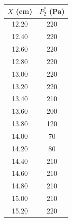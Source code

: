   \centering
  \caption[45 Hz 尾迹扫描数据]{45 Hz}
  \label{tab:exp6_45_Hz}
  \renewcommand{\arraystretch}{1.2}
  \begin{tabular}{cc}
    \toprule
    $X$ (cm) & $P_2^*$ (Pa) \\
    \midrule
    12.20 & 220 \\
    12.40 & 220 \\
    12.60 & 220 \\
    12.80 & 220 \\
    13.00 & 220 \\
    13.20 & 220 \\
    13.40 & 210 \\
    13.60 & 200 \\
    13.80 & 120 \\
    14.00 & 70 \\
    14.20 & 80 \\
    14.40 & 210 \\
    14.60 & 210 \\
    14.80 & 210 \\
    15.00 & 210 \\
    15.20 & 220 \\
    \bottomrule
  \end{tabular}